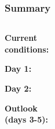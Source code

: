\documentclass[aspectratio=169, 10pt]{beamer}
\begin{document}
\begin{frame}
\frametitle{Summary}
\vspace{0cm}
\begin{columns}
\begin{column}{.15\textwidth}
\textbf{Current \\conditions:}

\vspace{1.3cm}
\textbf{Day 1:}

\vspace{1.3cm}
\textbf{Day 2:}

\vspace{1.3cm}
\textbf{Outlook \\(days 3-5):}
\end{column}
\begin{column}{.01\textwidth}




\end{column}
\begin{column}{.83\textwidth}
\end{column}
\end{columns}

\end{frame}





%
%









%
%
\end{document}
